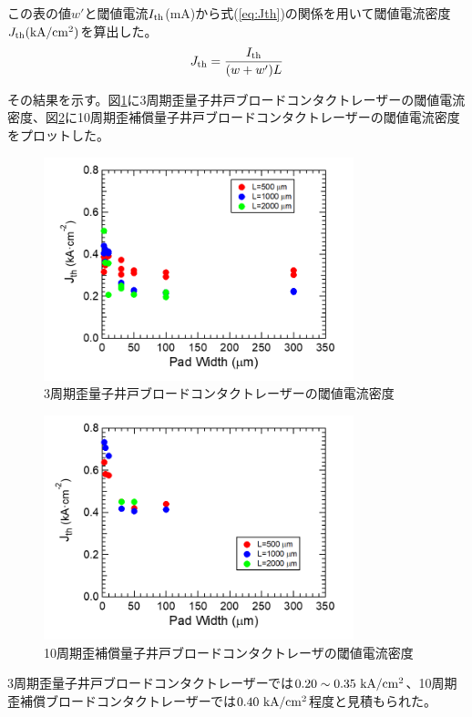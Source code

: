 この表の値$w'$と閾値電流$I_{\rm{th}}$(mA)から式(\ref{eq:Jth})の関係を用いて閾値電流密度$J_{\rm{th}} \rm{(kA/cm^2)}$を算出した。
\begin{eqnarray}
J_{\rm{th}}=\dfrac{I_{\rm{th}}}{(w+w')L}
\label{eq:Jth}
\end{eqnarray}

その結果を示す。図\ref{fig:fig_3_1_3QW_broadcontact_Jth}に3周期歪量子井戸ブロードコンタクトレーザーの閾値電流密度、図\ref{fig:fig_3_1_10QW_broadcontact_Jth}に10周期歪補償量子井戸ブロードコンタクトレーザーの閾値電流密度をプロットした。

\begin{figure}[h]
	\centering
	\includegraphics[width=9cm]{figure/fig_3_1_3QW_broadcontact_Jth.png}
		\caption{3周期歪量子井戸ブロードコンタクトレーザーの閾値電流密度}
		\label{fig:fig_3_1_3QW_broadcontact_Jth}
\end{figure}

\begin{figure}[ht]
	\centering
	\includegraphics[width=9cm]{figure/fig_3_1_10QW_broadcontact_Jth.png}
		\caption{10周期歪補償量子井戸ブロードコンタクトレーザの閾値電流密度}
		\label{fig:fig_3_1_10QW_broadcontact_Jth}
\end{figure}
3周期歪量子井戸ブロードコンタクトレーザーでは$0.20\sim 0.35\ \si{ \rm{  kA/cm^{2}}}$、10周期歪補償ブロードコンタクトレーザーでは$0.40\ \rm{  kA/cm^{2}}$程度と見積もられた。

